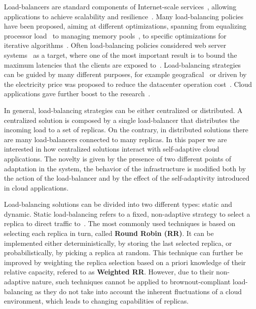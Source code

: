 Load-balancers are standard components of Internet-scale
services~\cite{WangOSDI}, allowing applications to achieve scalability
and resilience~\citep{Barroso09, Hamilton07:LISA,
  clusteredbalancing}. Many load-balancing policies have been
proposed, aiming at different optimizations, spanning from equalizing
processor load~\cite{Stankovic:TC} to managing memory
pools~\cite{PattersonMemoryLB,MemoryLBACC}, to specific optimizations
for iterative algorithms~\cite{BahiIterative}. Often load-balancing
policies considered web server systems~\cite{CLB,Cardellini2003} as a
target, where one of the most important result is to bound the maximum
latencies that the clients are exposed
to~\cite{TC-Abdelzaher}. Load-balancing strategies can be guided by
many different purposes, for example
geografical~\cite{GeograficalSASO,geographicalwanbalancing} or driven
by the electricity price was proposed to reduce the datacenter
operation cost~\cite{LoadBalancingForElectricity:TCC}. Cloud
applications gave further boost to the
research~\citep{Barroso09,Lu11:PerfEval,Lin12:IGCC}.

In general, load-balancing strategies can be either centralized or
distributed. A centralized solution is composed by a single
load-balancer that distributes the incoming load to a set of
replicas. On the contrary, in distributed solutions there are many
load-balancers connected to many replicas. In this paper we are
interested in how centralized solutions interact with self-adaptive
cloud applications. The novelty is given by the presence of two
different points of adaptation in the system, the behavior of the
infrastructure is modified both by the action of the load-balancer and
by the effect of the self-adaptivity introduced in cloud applications.

Load-balancing solutions can be divided into two different types:
static and dynamic. Static load-balancing refers to a fixed, non-adaptive
strategy to select a replica to direct traffic to~\cite{StaticLoadBalancing:TSE,StaticOptimal:ACM}.
The most commonly used techniques is based on selecting each replica in turn, called \textbf{Round Robin (RR)}. It can be implemented either deterministically, by storing the last selected replica, or probabilistically, by picking a replica at random.
This technique can further be improved by weighting the replica selection based on a priori
knowledge of their relative capacity, refered to as \textbf{Weighted RR}.
However, due to their non-adaptive nature, such techniques cannot be applied to
brownout-compliant load-balancing as they do not take into account
the inherent fluctuations of a cloud environment, which leads to changing
capabilities of replicas.

